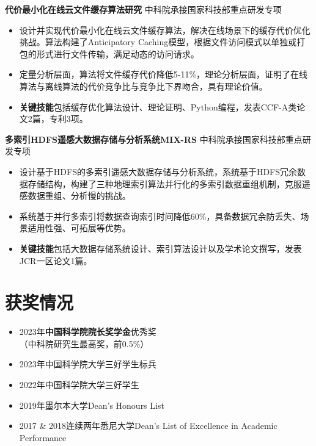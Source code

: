 \documentclass[UTF8,letterpaper,11pt]{article}
\begin{document}
\vspace{1pt}

\textbf{代价最小化在线云文件缓存算法研究} \hfill 中科院承接国家科技部重点研发专项

\begin{itemize}
  \setlength\itemsep{1.8pt}
  \item 设计并实现代价最小化在线云文件缓存算法，解决在线场景下的缓存代价优化挑战。算法构建了Anticipatory Caching模型，根据文件访问模式以单独或打包的形式进行文件传输，满足动态的访问请求。
  \item 定量分析层面，算法将文件缓存代价降低5-11\%，理论分析层面，证明了在线算法与离线算法的代价竞争比与竞争比下界吻合，具有理论价值。
  \item \textbf{关键技能}包括缓存优化算法设计、理论证明、Python编程，发表CCF-A类论文2篇，专利3项。
\end{itemize}

\vspace{1pt}

\textbf{多索引HDFS遥感大数据存储与分析系统MIX-RS} \hfill 中科院承接国家科技部重点研发专项

\begin{itemize}
  \setlength\itemsep{1.8pt}
  \item 设计基于HDFS的多索引遥感大数据存储与分析系统，系统基于HDFS冗余数据存储结构，构建了三种地理索引算法并行化的多索引数据重组机制，克服遥感数据重组、分析慢的挑战。
  \item 系统基于并行多索引将数据查询索引时间降低60\%，具备数据冗余防丢失、场景适用性强、可拓展等优势。
  \item \textbf{关键技能}包括大数据存储系统设计、索引算法设计以及学术论文撰写，发表JCR一区论文1篇。
\end{itemize}




\section{\textbf{获奖情况}}
\vspace{-5mm}
\begin{multicols}{2}
\begin{itemize}
  \setlength\itemsep{1.8pt}
  \item 2023年\textbf{中国科学院院长奖学金}优秀奖\\（中科院研究生最高奖，前0.5\%）
  \item 2023年中国科学院大学三好学生标兵
  \item 2022年中国科学院大学三好学生
  \item 2019年墨尔本大学Dean's Honours List
  \item 2017 \& 2018连续两年悉尼大学Dean's List of Excellence in Academic Performance
\end{itemize}
\end{multicols}
\end{document}
